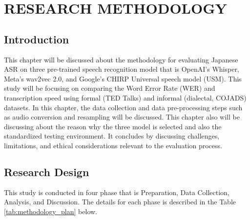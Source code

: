\chapter{RESEARCH METHODOLOGY}

\section{Introduction}
This chapter will be discussed about the methodology for evaluating Japanese ASR on three pre-trained speech recognition model that is OpenAI’s Whisper, Meta’s wav2vec 2.0, and Google’s CHIRP Universal speech model (USM). This study will be focusing on comparing the Word Error Rate (WER) and transcription speed using formal (TED Talks) and informal (dialectal, COJADS) datasets. In this chapter, the data collection and data pre-processing steps such as audio conversion and resampling will be discussed. This chapter also will be discussing about the reason why the three model is selected and also the standardized testing environment. It concludes by discussing challenges, limitations, and ethical considerations relevant to the evaluation process.

\section{Research Design}
This study is conducted in four phase that is Preparation, Data Collection, Analysis, and Discussion. The details for each phase is described in the Table \ref{tab:methodology_plan} below.

